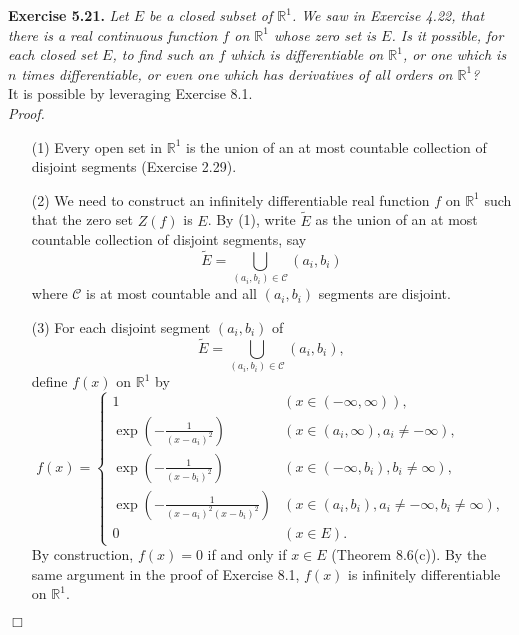 \documentclass{article}
\begin{document}



\textbf{Exercise 5.21.}
\emph{Let $E$ be a closed subset of $\mathbb{R}^1$.
We saw in Exercise 4.22, that there is a real continuous function $f$ on $\mathbb{R}^1$
whose zero set is $E$.
Is it possible, for each closed set $E$,
to find such an $f$ which is differentiable on $\mathbb{R}^1$,
or one which is $n$ times differentiable,
or even one which has derivatives of all orders on $\mathbb{R}^1$?} \\

It is possible by leveraging Exercise 8.1. \\

\emph{Proof.}
\begin{enumerate}
\item[(1)]
Every open set in $\mathbb{R}^1$ is the union of an at most countable collection
of disjoint segments (Exercise 2.29).

\item[(2)]
We need to construct an infinitely differentiable real function $f$ on $\mathbb{R}^1$
such that the zero set $Z(f)$ is $E$.
By (1), write $\widetilde{E}$ as the union of an at most countable collection of disjoint segments,
say
\[
  \widetilde{E} = \bigcup_{(a_i,b_i) \in \mathscr{C}} (a_i,b_i)
\]
where $\mathscr{C}$ is at most countable and all $(a_i,b_i)$ segments are disjoint.

\item[(3)]
For each disjoint segment $(a_i,b_i)$ of
\[
  \widetilde{E} = \bigcup_{(a_i,b_i) \in \mathscr{C}} (a_i,b_i),
\]
define $f(x)$ on $\mathbb{R}^1$ by
  \begin{equation*}
    f(x) =
      \begin{cases}
        1
          & (x \in (-\infty,\infty)), \\
        \exp(-\frac{1}{(x-a_i)^2})
          & (x \in (a_i,\infty), a_i \neq -\infty), \\
        \exp(-\frac{1}{(x-b_i)^2})
          & (x \in (-\infty,b_i), b_i \neq \infty), \\
        \exp(-\frac{1}{(x-a_i)^2(x-b_i)^2})
          & (x \in (a_i,b_i), a_i \neq -\infty, b_i \neq \infty), \\
        0
          & (x \in E).
      \end{cases}
  \end{equation*}
By construction, $f(x) = 0$ if and only if $x \in E$ (Theorem 8.6(c)).
By the same argument in the proof of Exercise 8.1,
$f(x)$ is infinitely differentiable on $\mathbb{R}^1$.
\end{enumerate}
$\Box$ \\\\
\end{document}
